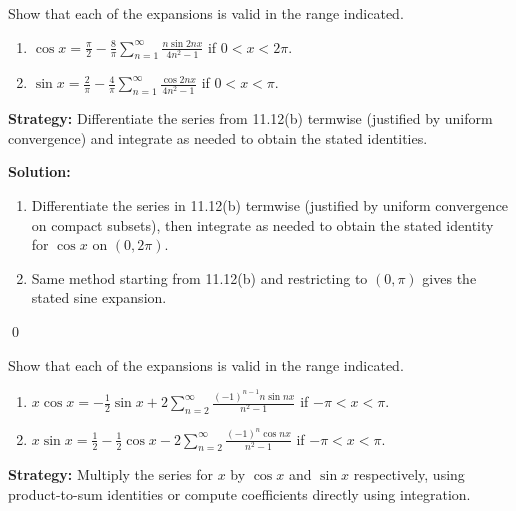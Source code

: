 \begin{problembox}
\begin{problemstatement}
Show that each of the expansions is valid in the range indicated.
\begin{enumerate}[label=(\alph*)]
\item $\cos x = \frac{\pi}{2} - \frac{8}{\pi} \sum_{n=1}^\infty \frac{n \sin 2nx}{4n^2 - 1}$ if $0 < x < 2\pi$.
\item $\sin x = \frac{2}{\pi} - \frac{4}{\pi} \sum_{n=1}^\infty \frac{\cos 2nx}{4n^2 - 1}$ if $0 < x < \pi$.
\end{enumerate}
\end{problemstatement}
\end{problembox}

\noindent\textbf{Strategy:} Differentiate the series from 11.12(b) termwise (justified by uniform convergence) and integrate as needed to obtain the stated identities.

\bigskip\noindent\textbf{Solution:}
\begin{enumerate}[label=(\alph*)]
\item Differentiate the series in 11.12(b) termwise (justified by uniform convergence on compact subsets), then integrate as needed to obtain the stated identity for $\cos x$ on $(0,2\pi)$.
\item Same method starting from 11.12(b) and restricting to $(0,\pi)$ gives the stated sine expansion.
\end{enumerate}\qed


\begin{problembox}
\begin{problemstatement}
Show that each of the expansions is valid in the range indicated.
\begin{enumerate}[label=(\alph*)]
\item $x \cos x = -\frac{1}{2} \sin x + 2 \sum_{n=2}^\infty \frac{(-1)^{n-1} n \sin nx}{n^2 - 1}$ if $-\pi < x < \pi$.
\item $x \sin x = \frac{1}{2} - \frac{1}{2} \cos x - 2 \sum_{n=2}^\infty \frac{(-1)^n \cos nx}{n^2 - 1}$ if $-\pi < x < \pi$.
\end{enumerate}
\end{problemstatement}
\end{problembox}

\noindent\textbf{Strategy:} Multiply the series for $x$ by $\cos x$ and $\sin x$ respectively, using product-to-sum identities or compute coefficients directly using integration.

